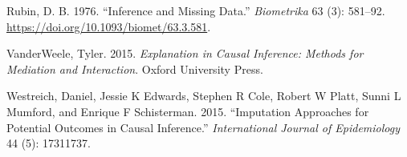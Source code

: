 \documentclass[
  singlecolumn]{report}
\newlength{\cslhangindent}
\newlength{\cslentryspacingunit} %
\newenvironment{CSLReferences}[2] %
 {%
  \setlength{\parindent}{0pt}
  \ifodd #1
  \let\oldpar\par
  \def\par{\hangindent=\cslhangindent\oldpar}
  \fi
  \setlength{\parskip}{#2\cslentryspacingunit}
 }%
 {}
\begin{document}
\begin{CSLReferences}{1}{0}
\leavevmode{}%
Rubin, D. B. 1976. {``Inference and Missing Data.''} \emph{Biometrika}
63 (3): 581--92. \url{https://doi.org/10.1093/biomet/63.3.581}.

\leavevmode{}%
VanderWeele, Tyler. 2015. \emph{Explanation in Causal Inference: Methods
for Mediation and Interaction}. Oxford University Press.

\leavevmode{}%
Westreich, Daniel, Jessie K Edwards, Stephen R Cole, Robert W Platt,
Sunni L Mumford, and Enrique F Schisterman. 2015. {``Imputation
Approaches for Potential Outcomes in Causal Inference.''}
\emph{International Journal of Epidemiology} 44 (5): 17311737.

\end{CSLReferences}
\end{document}
